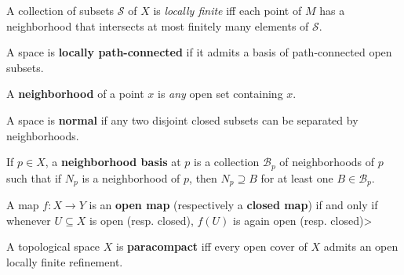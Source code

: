 \begin{definition}

A collection of subsets \({\mathcal{S}}\) of \(X\) is \emph{locally
finite} iff each point of \(M\) has a neighborhood that intersects at
most finitely many elements of \({\mathcal{S}}\).

\end{definition}

\begin{definition}

A space is \textbf{locally path-connected} if it admits a basis of
path-connected open subsets.

\end{definition}

\begin{definition}[Neighborhood]

A \textbf{neighborhood} of a point \(x\) is \emph{any} open set
containing \(x\).

\end{definition}

\begin{definition}[Normal]

A space is \textbf{normal} if any two disjoint closed subsets can be
separated by neighborhoods.

\end{definition}

\begin{definition}

If \(p\in X\), a \textbf{neighborhood basis} at \(p\) is a collection
\({\mathcal{B}}_{p}\) of neighborhoods of \(p\) such that if \(N_{p}\)
is a neighborhood of \(p\), then \(N_{p} \supseteq B\) for at least one
\(B\in {\mathcal{B}}_{p}\).

\end{definition}

\begin{definition}\label{def:open_closed_maps}

A map \(f:X\to Y\) is an \textbf{open map} (respectively a
\textbf{closed map}) if and only if whenever \(U \subseteq X\) is open
(resp. closed), \(f(U)\) is again open (resp. closed)\textgreater{}

\end{definition}

\begin{definition}[Paracompact]

A topological space \(X\) is \textbf{paracompact} iff every open cover
of \(X\) admits an open locally finite refinement.

\end{definition}

